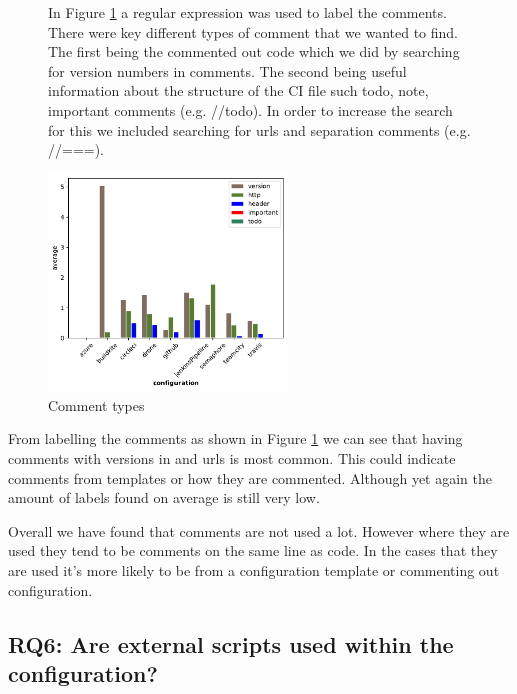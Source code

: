 \documentclass[10pt,conference]{IEEEtran}
\begin{document}
\begin{figure}[!ht]
  \centering
  \begin{minipage}[!t]{.48\textwidth}
    In Figure \ref{fig:comment_types} a regular expression was used to label the comments. There were key different types of comment that we wanted to find. The first being the commented out code which we did by searching for version numbers in comments. The second being useful information about the structure of the CI file such todo, note, important comments (e.g. //todo). In order to increase the search for this we included searching for urls and separation comments (e.g. //===).
    
  \end{minipage}%
  \hfill
  \begin{minipage}[!t]{.48\textwidth}
    \includegraphics[width=2.5in]{../src/results/comments usage bars.pdf}
    \caption[alt text]{Comment types}
    \label{fig:comment_types}  
  \end{minipage}
\end{figure}

From labelling the comments as shown in Figure \ref{fig:comment_types} we can see that having comments with versions in and urls is most common. This could indicate comments from templates or how they are commented. Although yet again the amount of labels found on average is still very low.

Overall we have found that comments are not used a lot. However where they are used they tend to be comments on the same line as code. In the cases that they are used it's more likely to be from a configuration template or commenting out configuration. 

\pagebreak

\vspace*{-0.05in}
\subsection{\textbf{RQ6}: Are external scripts used within the configuration?}
\label{section:RQ6}
\vspace*{-0.05in}
\end{document}
